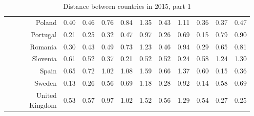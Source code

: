 \documentclass[a4paper,twoside,10pt]{article}
\begin{document}
\begin{table}[ht]
\begin{tabular}{r|rrrrrrrrrr}
			Poland & 0.40 & 0.46 & 0.76 & 0.84 & 1.35 & 0.43 & 1.11 & 0.36 & 0.37 & 0.47 \\
			Portugal & 0.21 & 0.25 & 0.32 & 0.47 & 0.97 & 0.26 & 0.69 & 0.15 & 0.79 & 0.90 \\
			Romania & 0.30 & 0.43 & 0.49 & 0.73 & 1.23 & 0.46 & 0.94 & 0.29 & 0.65 & 0.81 \\
			Slovenia & 0.61 & 0.52 & 0.37 & 0.21 & 0.52 & 0.52 & 0.24 & 0.58 & 1.24 & 1.30 \\
			Spain & 0.65 & 0.72 & 1.02 & 1.08 & 1.59 & 0.66 & 1.37 & 0.60 & 0.15 & 0.36 \\
			Sweden & 0.13 & 0.26 & 0.56 & 0.69 & 1.18 & 0.28 & 0.92 & 0.14 & 0.58 & 0.69 \\
			United Kingdom & 0.53 & 0.57 & 0.97 & 1.02 & 1.52 & 0.56 & 1.29 & 0.54 & 0.27 & 0.25 \\
			\hline
		\end{tabular}
		\caption{Distance between countries in 2015, part 1}
		\label{tab:distance_2015}
	\end{table}
	
\end{document}
